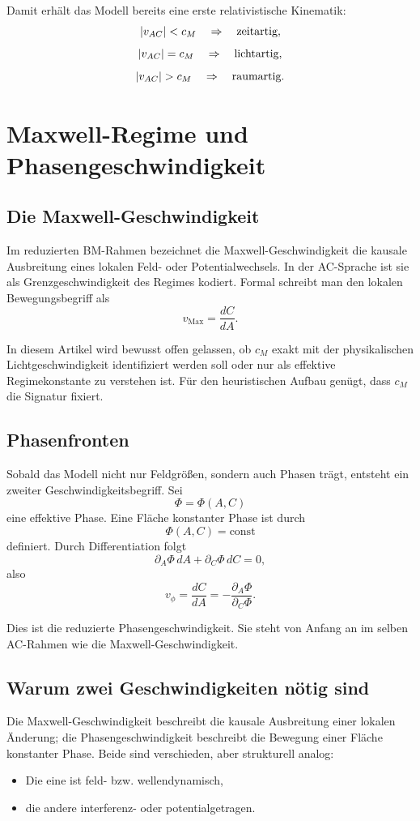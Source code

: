 \documentclass[11pt,a4paper]{article}
\theoremstyle{definition}
\theoremstyle{plain}
\begin{document}
	Damit erhält das Modell bereits eine erste relativistische Kinematik:
	\[
	\abs{v_{AC}} < c_M \quad \Rightarrow \quad \text{zeitartig},
	\]
	\[
	\abs{v_{AC}} = c_M \quad \Rightarrow \quad \text{lichtartig},
	\]
	\[
	\abs{v_{AC}} > c_M \quad \Rightarrow \quad \text{raumartig}.
	\]
	
	\section{Maxwell-Regime und Phasengeschwindigkeit}
	
	\subsection{Die Maxwell-Geschwindigkeit}
	
	Im reduzierten BM-Rahmen bezeichnet die Maxwell-Geschwindigkeit die kausale Ausbreitung eines lokalen Feld- oder Potentialwechsels. In der AC-Sprache ist sie als Grenzgeschwindigkeit des Regimes kodiert. Formal schreibt man den lokalen Bewegungsbegriff als
	\[
	v_{\mathrm{Max}} = \frac{dC}{dA}.
	\]
	
	In diesem Artikel wird bewusst offen gelassen, ob $c_M$ exakt mit der physikalischen Lichtgeschwindigkeit identifiziert werden soll oder nur als effektive Regimekonstante zu verstehen ist. Für den heuristischen Aufbau genügt, dass $c_M$ die Signatur fixiert.
	
	\subsection{Phasenfronten}
	
	Sobald das Modell nicht nur Feldgrößen, sondern auch Phasen trägt, entsteht ein zweiter Geschwindigkeitsbegriff. Sei
	\[
	\Phi = \Phi(A,C)
	\]
	eine effektive Phase. Eine Fläche konstanter Phase ist durch
	\[
	\Phi(A,C)=\text{const}
	\]
	definiert. Durch Differentiation folgt
	\[
	\partial_A \Phi\, dA + \partial_C \Phi\, dC = 0,
	\]
	also
	\[
	v_\phi = \frac{dC}{dA} = -\frac{\partial_A \Phi}{\partial_C \Phi}.
	\]
	
	Dies ist die reduzierte Phasengeschwindigkeit. Sie steht von Anfang an im selben AC-Rahmen wie die Maxwell-Geschwindigkeit.
	
	\subsection{Warum zwei Geschwindigkeiten nötig sind}
	
	Die Maxwell-Geschwindigkeit beschreibt die kausale Ausbreitung einer lokalen Änderung; die Phasengeschwindigkeit beschreibt die Bewegung einer Fläche konstanter Phase. Beide sind verschieden, aber strukturell analog:
	\begin{itemize}[leftmargin=2em]
		\item Die eine ist feld- bzw. wellendynamisch,
		\item die andere interferenz- oder potentialgetragen.
	\end{itemize}
	
\end{document}
